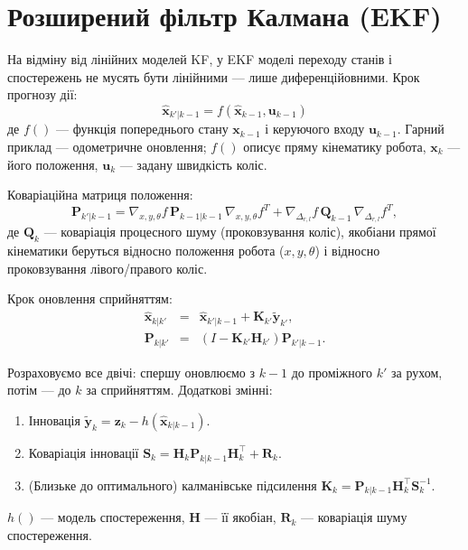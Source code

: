 \section{Розширений фільтр Калмана (EKF)}\label{sec:EKF}
На відміну від лінійних моделей KF, у EKF моделі переходу станів і спостережень не мусять бути лінійними — лише диференційовними. Крок прогнозу дії:
\begin{equation}
\hat{\boldsymbol{x}}_{k'|k-1} = f(\hat{\boldsymbol{x}}_{k-1}, \boldsymbol{u}_{k-1})
\end{equation}
де $f()$ — функція попереднього стану $\boldsymbol{x}_{k-1}$ і керуючого входу $\boldsymbol{u}_{k-1}$. Гарний приклад — одометричне оновлення; $f()$ описує пряму кінематику робота, $\boldsymbol{x}_k$ — його положення, $\boldsymbol{u}_k$ — задану швидкість коліс.

Коваріаційна матриця положення:
\begin{equation}
\boldsymbol{P}_{k'|k-1} = \nabla_{x,y,\theta}f\, \boldsymbol{P}_{k-1|k-1}\, \nabla_{x,y,\theta}f^T + \nabla_{\Delta_{r,l}}f\, \boldsymbol{Q}_{k-1}\, \nabla_{\Delta_{r,l}}f^T,
\end{equation}
де $\boldsymbol{Q}_k$ — коваріація процесного шуму (проковзування коліс), якобіани прямої кінематики беруться відносно положення робота ($x,y,\theta$) і відносно проковзування лівого/правого коліс.

Крок оновлення сприйняттям:
\begin{eqnarray}
\hat{\boldsymbol{x}}_{k|k'} &=& \hat{\boldsymbol{x}}_{k'|k-1} + \boldsymbol{K}_{k'}\tilde{\boldsymbol{y}}_{k'},\\
\boldsymbol{P}_{k|k'} &=& (I - \boldsymbol{K}_{k'} \boldsymbol{H}_{k'}) \boldsymbol{P}_{k'|k-1}.
\end{eqnarray}

Розраховуємо все двічі: спершу оновлюємо з $k-1$ до проміжного $k'$ за рухом, потім — до $k$ за сприйняттям. Додаткові змінні:
\begin{enumerate}
\item Інновація $\tilde{\boldsymbol{y}}_{k}=\boldsymbol{z}_{k}-h(\hat{\boldsymbol{x}}_{k|k-1})$.
\item Коваріація інновації $\boldsymbol{S}_{k}=\boldsymbol{H}_{k}\boldsymbol{P}_{k|k-1}\boldsymbol{H}_{k}^\top + \boldsymbol{R}_{k}$.
\item (Близьке до оптимального) калманівське підсилення $\boldsymbol{K}_{k}=\boldsymbol{P}_{k|k-1}\boldsymbol{H}_{k}^\top \boldsymbol{S}_{k}^{-1}$.
\end{enumerate}
$h()$ — модель спостереження, $\boldsymbol{H}$ — її якобіан, $\boldsymbol{R}_{k}$ — коваріація шуму спостереження.

